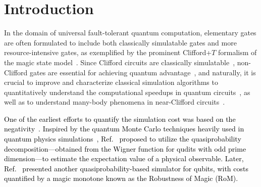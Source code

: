 \documentclass[aps,prx,onecolumn,superscriptaddress,nobibnotes,nofootinbib]{revtex4-2}
\newcommand{\black}[1]{\textcolor{black}{#1}}
\begin{document}
\section{Introduction}

In the domain of universal fault-tolerant quantum computation, elementary gates are often formulated to include both classically simulatable gates and more resource-intensive gates, as exemplified by the prominent Clifford+$T$ formalism of the magic state model~\cite{gottesmanHeisenbergRepresentationQuantum1998, nielsenQuantumComputationQuantum2010, bravyiUniversalQuantumComputation2005, litinskiGameSurfaceCodes2019, horsmanSurfaceCodeQuantum2012, fowler2019lowoverheadquantumcomputation}. Since Clifford circuits are classically simulatable~\cite{gottesmanHeisenbergRepresentationQuantum1998}, non-Clifford gates are essential for achieving quantum advantage~\cite{gidneyHowFactor20482021, leeEvenMoreEfficient2021, vonburgQuantumComputingEnhanced2021, yoshiokaHuntingQuantumclassicalCrossover2023}, and naturally, it is crucial to improve and characterize classical simulation algorithms to quantitatively understand the computational speedups in quantum circuits~\cite{bravyiTradingClassicalQuantum2016, bravyi2016improved, Bravyi2019simulationofquantum,tirritoQuantifyingNonstabilizernessEntanglement2023, hahnQuantifyingQubitMagic2022, PhysRevLett.132.240602, seddonQuantifyingQuantumSpeedups2021, liuManybodyQuantumMagic2022, leoneStabilizerEnyiEntropy2022}, as well as to understand many-body phenomena in near-Clifford circuits~\cite{zhou2020single, white2021conformal, sewell2022manaa, oliviero2022magicstatea}.

\black{
  One of the earliest efforts to quantify the simulation cost was based on the negativity~\cite{pashayanEstimatingOutcomeProbabilities2015}. Inspired by the quantum Monte Carlo techniques heavily used in quantum physics simulations~\cite{ceperley1995path, foulkes2001quantum},  Ref.~\cite{pashayanEstimatingOutcomeProbabilities2015} proposed to utilize the quasiprobability decomposition---obtained from the Wigner function for qudits with odd prime dimension---to estimate the expectation value of a physical observable.
  Later, Ref.~\cite{PhysRevLett.118.090501} presented another quasiprobability-based simulator for qubits, with costs quantified by a magic monotone known as the Robustness of Magic (RoM).
}
\end{document}
